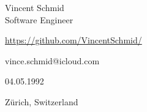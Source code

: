 {\sectionfont\fontsize{30}{30}\selectfont
Vincent Schmid\\[0.25em]
}
{\sectionfont\fontsize{14}{14}\selectfont\color{altColor}
Software Engineer\\[1.2em]
}
\begin{minipage}[t]{0.55\textwidth}
    \begin{description}[labelwidth=2em]
        \item[\faGithub\color{altColor}] \href{https://github.com/VincentSchmid/}{https://github.com/VincentSchmid/}
        \item[\faEnvelopeO\color{altColor}] vince.schmid@icloud.com
    \end{description}
\end{minipage}
\hfill
\begin{minipage}[t]{0.4\textwidth}
    \begin{description}[labelwidth=2em]
        \item[\faBirthdayCake\color{altColor}] 04.05.1992
        \item[\faMapMarker\color{altColor}] Zürich, Switzerland
    \end{description}
\end{minipage}
